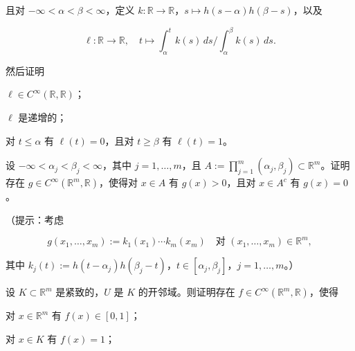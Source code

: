 \begin{exercises}
且对 $ -\infty < \alpha < \beta < \infty $，定义 $ k : \mathbb{R} \to \mathbb{R} $，$ s \mapsto h(s - \alpha)h(\beta - s) $，以及

\[
\ell : \mathbb{R} \to \mathbb{R} , \quad t \mapsto \int_{\alpha}^{t} k(s) \, ds / \int_{\alpha}^{\beta} k(s) \, ds .
\]

然后证明

\begin{items}
\item

$ \ell \in C^{\infty}(\mathbb{R}, \mathbb{R}) $；

\item

$ \ell $ 是递增的；

\item

对 $ t \le \alpha $ 有 $ \ell(t) = 0 $，且对 $ t \ge \beta $ 有 $ \ell(t) = 1 $。

\end{items}

\item

设 $ -\infty < \alpha_{j} < \beta_{j} < \infty $，其中 $ j = 1, \ldots, m $，且 $ A := \prod_{j=1}^{m}(\alpha_{j}, \beta_{j}) \subset \mathbb{R}^{m} $。证明存在 $ g \in C^{\infty}(\mathbb{R}^{m}, \mathbb{R}) $，使得对 $ x \in A $ 有 $ g(x) > 0 $，且对 $ x \in A^{c} $ 有 $ g(x) = 0 $。

（提示：考虑

\[
g(x_{1}, \ldots, x_{m}) := k_{1}(x_{1}) \cdots k_{m}(x_{m}) \quad \text{对 } (x_{1}, \ldots, x_{m}) \in \mathbb{R}^{m} ,
\]

其中 $ k_{j}(t) := h(t - \alpha_{j})h(\beta_{j} - t) $，$ t \in [\alpha_{j}, \beta_{j}] $，$ j = 1, \ldots, m $。）

\item

设 $ K \subset \mathbb{R}^{m} $ 是紧致的，$ U $ 是 $ K $ 的开邻域。则证明存在 $ f \in C^{\infty}(\mathbb{R}^{m}, \mathbb{R}) $，使得

\begin{items}
\item

对 $ x \in \mathbb{R}^{m} $ 有 $ f(x) \in [0, 1] $；

\item

对 $ x \in K $ 有 $ f(x) = 1 $；

\item


\end{items}
\end{exercises}
